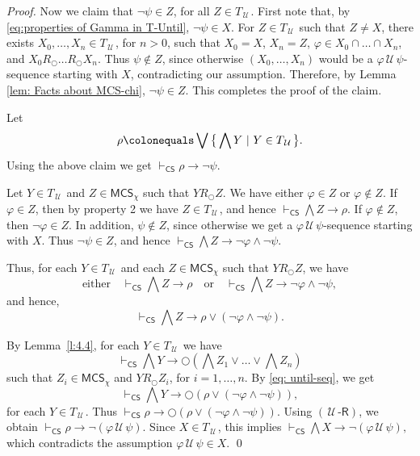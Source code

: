 \documentclass[envcountsect,envcountsame,oribibl,orivec]{llncs}
\newcommand{\lnext}{\bigcirc}
\newcommand{\luntil}{{\,\mathcal{U}\,}}
\newcommand{\uindrule}{\ensuremath{(\luntil\textsf{-R})}}
\newcommand{\CS}{\textsf{CS}}
\renewcommand{\phi}{\varphi}
\newcommand{\MCS}{\mathsf{MCS}}
\begin{document}
\begin{proof}
	Now we claim that $\neg \psi \in Z$, for all $Z \in T_\luntil$. %
	First note that, by \eqref{eq:properties of Gamma in T-Until}, $\neg \psi \in X$. For $Z \in T_\luntil$ such that $Z \neq X$, there exists $X_0, \ldots,X_n \in T_\luntil$, for $n > 0$, such that $X_0 = X$, $X_n = Z$, $\phi \in X_0 \cap \ldots \cap X_n$, and 
	$X_0 R_\lnext \ldots R_\lnext X_n$. Thus $\psi \not \in Z$, since otherwise $
	(X_0, \ldots,X_n)
	$ would be a $\phi \luntil \psi$-sequence starting with $X$, contradicting our assumption. Therefore, by Lemma \ref{lem: Facts about MCS-chi}, $\neg \psi \in Z$. This completes the proof of the claim.
	
	Let 
	\[
	\rho \colonequals \bigvee \big\{ \bigwedge Y \ |\ Y \in T_\luntil \big\}.
	\]
	Using the above claim we get $\vdash_\CS \rho \to \lnot \psi$. 
	
	Let $Y \in T_\luntil$ and  $Z \in \MCS_\chi$ such that $Y R_\lnext Z$. We have either $\phi \in Z$ or $\phi \not \in Z$. 
	If $\phi \in Z$, then by property 2 we have $Z \in T_\luntil$, and hence $\vdash_\CS \bigwedge Z \to \rho$. 
	If $\phi \not \in Z$, then $\neg \phi \in Z$. In addition, $\psi \not \in Z$, since otherwise we get a $\phi \luntil \psi$-sequence starting with $X$. Thus $\neg \psi \in Z$, and hence $\vdash_\CS \bigwedge Z \to \neg \phi \wedge \neg \psi$.
	
	Thus, for each $Y \in T_\luntil$ and each $Z \in \MCS_\chi$ such that $Y R_\lnext Z$, we have
	\[
	\text{either}\quad
	\vdash_\CS \bigwedge Z \to \rho \quad \text{or} \quad \vdash_\CS \bigwedge Z \to \lnot \phi \land \lnot \psi,
	\]
	and hence, 
	\begin{equation}\label{eq: until-seq}
		\vdash_\CS \bigwedge Z \to \rho \vee (\lnot \phi \land \lnot \psi).
	\end{equation}
	
	By Lemma~\ref{l:4.4}, for each $Y \in T_\luntil$ we have 
	\[
	\vdash_\CS \bigwedge Y \to \lnext (\bigwedge Z_1  \vee \ldots \vee \bigwedge Z_n)
	\]
	such that $Z_i \in \MCS_\chi$ and $Y R_\lnext Z_i$, for $i=1,\ldots,n$. By \eqref{eq: until-seq}, we get 
	\[
	\vdash_\CS \bigwedge Y \to \lnext (\rho \vee (\neg \phi \wedge \neg \psi)),
	\]
	for each $Y \in T_\luntil$. Thus
	$
	\vdash_\CS \rho \to \lnext (\rho \lor (\lnot \phi \land \lnot \psi)).
	$
	Using $\uindrule$, we obtain $\vdash_\CS \rho \to \lnot(\phi \luntil \psi)$.
	Since $X \in T_\luntil$, this implies  
	$
	\vdash_\CS \bigwedge X \to \lnot(\phi \luntil \psi),
	$
	which contradicts the assumption
	$\phi \luntil \psi \in X$.  \qed
\end{proof}
\end{document}
